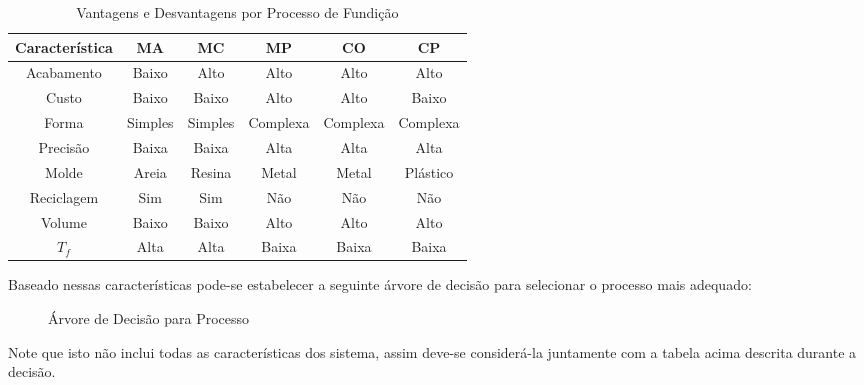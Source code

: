 \documentclass{article}
\begin{document}
                \begin{table}[H]
                    \centering
                    \begin{tabular}[]{c | c c c c c}\hline
                        Característica & MA      & MC      & MP       & CO       & CP\\\hline
                        Acabamento     & Baixo   & Alto    & Alto     & Alto     & Alto\\
                        Custo          & Baixo   & Baixo   & Alto     & Alto     & Baixo\\
                        Forma          & Simples & Simples & Complexa & Complexa & Complexa\\
                        Precisão       & Baixa   & Baixa   & Alta     & Alta     & Alta\\
                        Molde          & Areia   & Resina  & Metal    & Metal    & Plástico\\
                        Reciclagem     & Sim     & Sim     & Não      & Não      & Não\\
                        Volume         & Baixo   & Baixo   & Alto     & Alto     & Alto\\\hline
                        $T_{f}$        & Alta    & Alta    & Baixa    & Baixa    & Baixa\\\hline
                    \end{tabular}
                    \caption{Vantagens e Desvantagens por Processo de Fundição}
                \end{table}\noindent
            Baseado nessas características pode-se estabelecer a seguinte árvore de decisão para selecionar o processo mais adequado:
                \begin{figure}[H]
                    \centering
                    \caption{Árvore de Decisão para Processo}
                \end{figure}\noindent
            Note que isto não inclui todas as características dos sistema, assim deve-se considerá-la juntamente com a tabela acima descrita durante a decisão.
\end{document}
